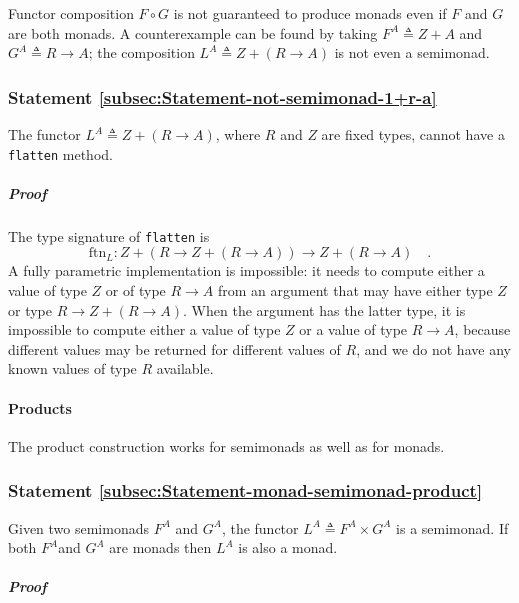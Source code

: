 Functor composition $F\circ G$ is not guaranteed to produce monads
even if $F$ and $G$ are both monads. A counterexample can be found
by taking $F^{A}\triangleq Z+A$ and $G^{A}\triangleq R\rightarrow A$;
the composition $L^{A}\triangleq Z+\left(R\rightarrow A\right)$ is
not even a semimonad.

\subsubsection{Statement \label{subsec:Statement-not-semimonad-1+r-a}\ref{subsec:Statement-not-semimonad-1+r-a}}

The functor $L^{A}\triangleq Z+\left(R\rightarrow A\right)$, where
$R$ and $Z$ are fixed types, cannot have a \lstinline!flatten!
method.

\subparagraph{Proof}

The type signature of \lstinline!flatten! is
\[
\text{ftn}_{L}:Z+\left(R\rightarrow Z+\left(R\rightarrow A\right)\right)\rightarrow Z+\left(R\rightarrow A\right)\quad.
\]
A fully parametric implementation is impossible: it needs to compute
either a value of type $Z$ or of type $R\rightarrow A$ from an argument
that may have either type $Z$ or type $R\rightarrow Z+\left(R\rightarrow A\right)$.
When the argument has the latter type, it is impossible to compute
either a value of type $Z$ or a value of type $R\rightarrow A$,
because different values may be returned for different values of $R$,
and we do not have any known values of type $R$ available. 

\paragraph{Products}

The product construction works for semimonads as well as for monads.

\subsubsection{Statement \label{subsec:Statement-monad-semimonad-product}\ref{subsec:Statement-monad-semimonad-product}}

Given two semimonads $F^{A}$ and $G^{A}$, the functor $L^{A}\triangleq F^{A}\times G^{A}$
is a semimonad. If both $F^{A}$and $G^{A}$ are monads then $L^{A}$
is also a monad.

\subparagraph{Proof}

